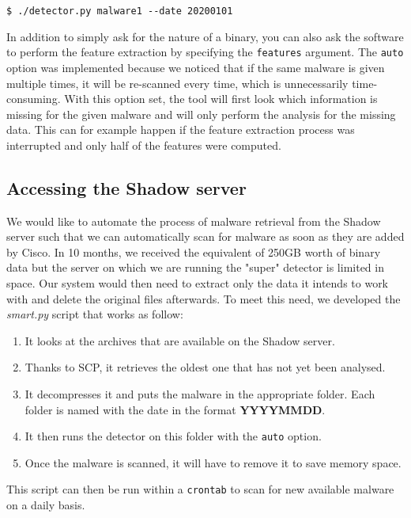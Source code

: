\begin{lstlisting}
$ ./detector.py malware1 --date 20200101
\end{lstlisting}

In addition to simply ask for the nature of a binary, you can also ask  the software to perform the feature extraction by specifying the \texttt{features} argument. The \texttt{auto} option was implemented because we noticed that if the same malware is given multiple times, it will be re-scanned every time, which is unnecessarily time-consuming. With this option set, the tool will first look which information is missing for the given malware and will only perform the analysis for the missing data. This can for example happen if the feature extraction process was interrupted and only half of the features were computed.

\subsection{Accessing the Shadow server}

We would like to automate the process of malware retrieval from the Shadow server such that we can automatically scan for malware as soon as they are added by Cisco. In 10 months, we received the equivalent of 250GB worth of binary data but the server on which we are running the "super" detector is limited in space. Our system would then need to extract only the data it intends to work with and delete the original files afterwards. To meet this need, we developed the \textit{smart.py} script that works as follow:

\begin{enumerate}
    \item It looks at the archives that are available on the Shadow server.
    \item Thanks to SCP, it retrieves the oldest one that has not yet been analysed.
    \item It decompresses it and puts the malware in the appropriate folder. Each folder is named with the date in the format \textbf{YYYYMMDD}.
    \item It then runs the detector on this folder with the \texttt{auto} option.
    \item Once the malware is scanned, it will have to remove it to save memory space.
\end{enumerate}
This script can then be run within a \texttt{crontab} to scan for new available malware on a daily basis.

